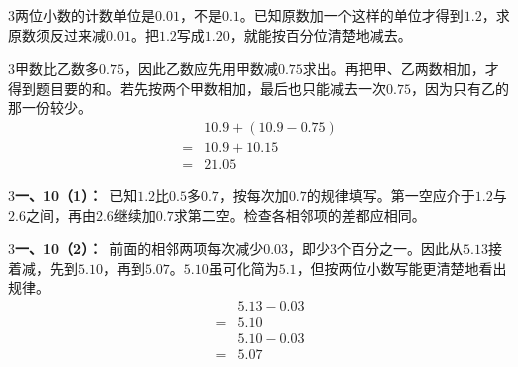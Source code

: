 \documentclass[multi=snippet,border={5bp 20bp 5bp 5bp}]{standalone}
\newenvironment{snippet}[3]{\begin{minipage}{#1bp}\color{answerred}\fontsize{#2}{#3}\selectfont\raggedright}{\end{minipage}}
\begin{document}
\begin{snippet}{505}{11.5}{14}\begin{multicols}{3}\raggedcolumns 两位小数的计数单位是\(0.01\)\allowbreak ，不是\(0.1\)\allowbreak 。已知原数加一个这样的单位才得到\(1.2\)\allowbreak ，求原数须反过来减\(0.01\)\allowbreak 。把\(1.2\)\allowbreak 写成\(1.20\)\allowbreak ，就能按百分位清楚地减去。\end{multicols}\end{snippet}
\begin{snippet}{505}{11.5}{14}\begin{multicols}{3}\raggedcolumns 甲数比乙数多\(0.75\)\allowbreak ，因此乙数应先用甲数减\(0.75\)\allowbreak 求出。再把甲、乙两数相加，才得到题目要的和。若先按两个甲数相加，最后也只能减去一次\(0.75\)\allowbreak ，因为只有乙的那一份较少。\[\begin{aligned}&10.9+(10.9-0.75)\\={}&10.9+10.15\\={}&21.05\end{aligned}\]\end{multicols}\end{snippet}
\begin{snippet}{505}{11.5}{14}\begin{multicols}{3}\raggedcolumns \textbf{一、10（1）：}\ 已知\(1.2\)\allowbreak 比\(0.5\)\allowbreak 多\(0.7\)\allowbreak ，按每次加\(0.7\)\allowbreak 的规律填写。第一空应介于\(1.2\)\allowbreak 与\(2.6\)\allowbreak 之间，再由\(2.6\)\allowbreak 继续加\(0.7\)\allowbreak 求第二空。检查各相邻项的差都应相同。\end{multicols}\end{snippet}
\begin{snippet}{505}{11.5}{14}\begin{multicols}{3}\raggedcolumns \textbf{一、10（2）：}\ 前面的相邻两项每次减少\(0.03\)\allowbreak ，即少3个百分之一。因此从\(5.13\)\allowbreak 接着减，先到\(5.10\)\allowbreak ，再到\(5.07\)\allowbreak 。\(5.10\)\allowbreak 虽可化简为\(5.1\)\allowbreak ，但按两位小数写能更清楚地看出规律。\[\begin{aligned}&5.13-0.03\\={}&5.10\\&5.10-0.03\\={}&5.07\end{aligned}\]\end{multicols}\end{snippet}
\end{document}
